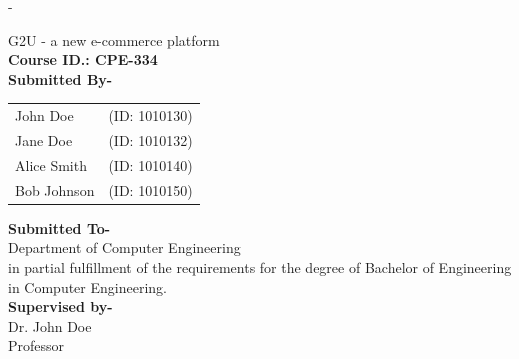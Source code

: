 \begin{titlingpage}
	\begin{SingleSpace}
		\calccentering{\unitlength} 
		\begin{adjustwidth*}{\unitlength}{-\unitlength}
			\begin{center}
				{\HUGE G2U - a new e-commerce platform}\\[4mm]
				\vspace{3mm}
				{\large \textbf{Course ID.: CPE-334}}\\
				\vspace{12mm}
				{\large \textbf{Submitted By-}}\\
				\begin{center}
					\begin{tabular}{@{} l l @{}}  %
						\large John Doe & \large (ID: 1010130) \\
						\large Jane Doe & \large (ID: 1010132) \\
						\large Alice Smith & \large (ID: 1010140) \\
						\large Bob Johnson & \large (ID: 1010150) \\
					\end{tabular}
				\end{center}	
				\vspace{12mm}
				{\large \textbf{Submitted To-} }\\
				\vspace{3mm}
				{\large {Department of Computer Engineering}}\\
				{\large {in partial fulfillment of the requirements for the degree of
						Bachelor of Engineering in Computer Engineering.}}\\
				\vspace{12mm}
				{\large \textbf{Supervised by-} }\\
				\vspace{3mm}
				{\large{Dr. John Doe}}\\
				{\large {Professor}}\\
				

\end{center}
\end{adjustwidth*}
\end{SingleSpace}
\end{titlingpage}
